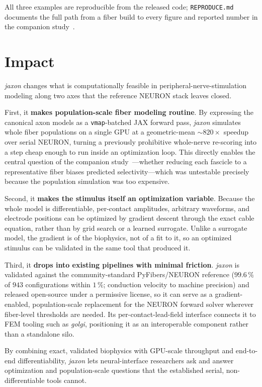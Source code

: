 \documentclass[preprint,12pt,a4paper]{elsarticle}
\begin{document}
All three examples are reproducible from the released code; \texttt{REPRODUCE.md} documents the
full path from a fiber build to every figure and reported number in the companion
study~\cite{companion}.

\section{Impact}

\emph{jaxon} changes what is computationally feasible in peripheral-nerve-stimulation modeling
along two axes that the reference NEURON stack leaves closed.

First, it \textbf{makes population-scale fiber modeling routine}. By expressing the canonical
axon models as a \texttt{vmap}-batched JAX forward pass, \emph{jaxon} simulates whole fiber
populations on a single GPU at a geometric-mean ${\sim}820\times$ speedup over serial NEURON,
turning a previously prohibitive whole-nerve re-scoring into a step cheap enough to run inside
an optimization loop. This directly enables the central question of the companion
study~\cite{companion}---whether reducing each fascicle to a representative fiber biases predicted
selectivity---which was untestable precisely because the population simulation was too expensive.

Second, it \textbf{makes the stimulus itself an optimization variable}. Because the whole model
is differentiable, per-contact amplitudes, arbitrary waveforms, and electrode positions can be
optimized by gradient descent through the exact cable equation, rather than by grid search or a
learned surrogate. Unlike a surrogate model, the gradient is of the biophysics, not of a fit to
it, so an optimized stimulus can be validated in the same tool that produced it.

Third, it \textbf{drops into existing pipelines with minimal friction}. \emph{jaxon} is
validated against the community-standard PyFibers/NEURON reference ($99.6\,\%$ of $943$
configurations within $1\,\%$; conduction velocity to machine precision) and released
open-source under a permissive license, so it can serve as a gradient-enabled, population-scale
replacement for the NEURON forward solver wherever fiber-level thresholds are needed. Its
per-contact-lead-field interface connects it to FEM tooling such as \emph{golgi}, positioning it
as an interoperable component rather than a standalone silo.

By combining exact, validated biophysics with GPU-scale throughput and end-to-end
differentiability, \emph{jaxon} lets neural-interface researchers ask and answer optimization and
population-scale questions that the established serial, non-differentiable tools cannot.
\end{document}
